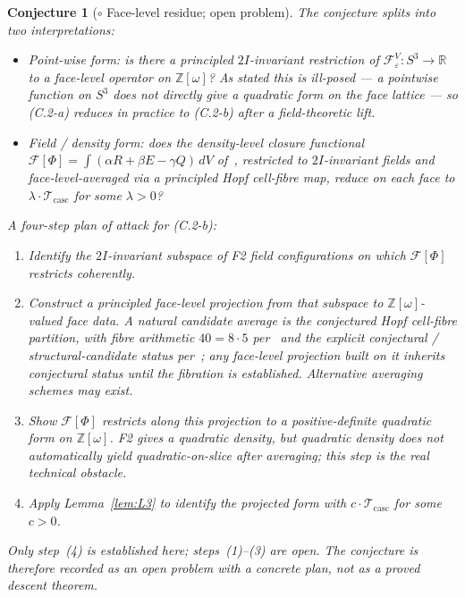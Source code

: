 \documentclass[12pt]{article}
\newtheorem{conjecture}[theorem]{Conjecture}
\newcommand{\Tcasc}{\mathcal{T}_{\mathrm{casc}}}
\newcommand{\Fcal}{\mathcal{F}}
\newcommand{\Zom}{\mathbb{Z}[\omega]}
\begin{document}
\begin{conjecture}[$\circ$ Face-level residue; open problem]\label{conj:C2}
The conjecture splits into two interpretations:
\begin{itemize}
\item[(C.2-a)] \emph{Point-wise form}: is there a principled
$2I$-invariant restriction of $\Fcal^V_\varepsilon : S^3 \to \mathbb{R}$
to a face-level operator on $\Zom$? As stated this is ill-posed --- a
pointwise function on $S^3$ does not directly give a quadratic form
on the face lattice --- so (C.2-a) reduces in practice to (C.2-b)
after a field-theoretic lift.
\item[(C.2-b)] \emph{Field / density form}: does the density-level
closure functional $\Fcal[\Phi] = \int(\alpha R + \beta E - \gamma Q)\,dV$
of~\cite[\S F2]{CascadeFoundations}, restricted to $2I$-invariant
fields and face-level-averaged via a principled Hopf cell-fibre map,
reduce on each face to $\lambda\cdot\Tcasc$ for some $\lambda > 0$?
\end{itemize}
A four-step plan of attack for (C.2-b):
\begin{enumerate}
\item Identify the $2I$-invariant subspace of F2 field configurations
on which $\Fcal[\Phi]$ restricts coherently.
\item Construct a principled face-level projection from that subspace
to $\Zom$-valued face data. A natural candidate average is the
conjectured Hopf cell-fibre partition, with fibre arithmetic
$40 = 8 \cdot 5$ per~\cite[\S 3.2]{CascadeBio} and the explicit
conjectural / structural-candidate status per~\cite[\S 2.6]{CascadeBio};
any face-level projection built on it inherits conjectural status
until the fibration is established. Alternative averaging schemes
may exist.
\item Show $\Fcal[\Phi]$ restricts along this projection to a
positive-definite quadratic form on $\Zom$. F2 gives a quadratic
density, but quadratic density does not automatically yield
quadratic-on-slice after averaging; this step is the real technical
obstacle.
\item Apply Lemma~\ref{lem:L3} to identify the projected form with
$c \cdot \Tcasc$ for some $c > 0$.
\end{enumerate}
Only step~(4) is established here; steps~(1)--(3) are open. The
conjecture is therefore recorded as an open problem with a concrete
plan, not as a proved descent theorem.
\end{conjecture}
\end{document}

